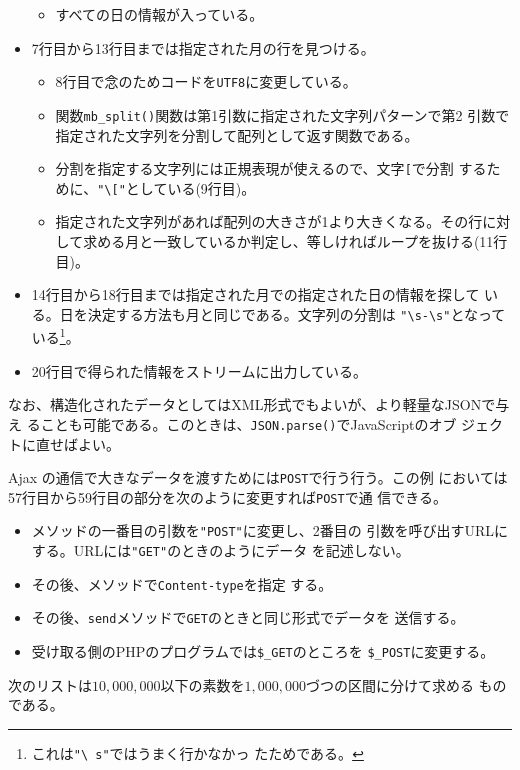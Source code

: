 \begin{Exec}
\begin{itemize}
\begin{itemize}
 \item すべての日の情報が入っている。
\end{itemize}
 \item 7行目から13行目までは指定された月の行を見つける。
\begin{itemize}
 \item 8行目で念のためコードを\texttt{UTF8}に変更している。
 \item 関数\Verb+mb_split()+関数は第1引数に指定された文字列パターンで第2
       引数で指定された文字列を分割して配列として返す関数である。
 \item 分割を指定する文字列には正規表現が使えるので、文字\Verb+[+で分割
       するために、\Verb+"\["+としている(9行目)。
 \item 指定された文字列があれば配列の大きさが1より大きくなる。その行に対
       して求める月と一致しているか判定し、等しければループを抜ける(11行
       目)。
\end{itemize}
 \item 14行目から18行目までは指定された月での指定された日の情報を探して
       いる。日を決定する方法も月と同じである。文字列の分割は
       \Verb+"\s-\s"+となっている\footnote{これは\texttt{"\textbackslash
       s"}ではうまく行かなかっ
       たためである。}。
 \item 20行目で得られた情報をストリームに出力している。
\end{itemize}
\end{Exec}
なお、構造化されたデータとしてはXML形式でもよいが、より軽量なJSONで与え
ることも可能である。このときは、\texttt{JSON.parse()}でJavaScriptのオブ
ジェクトに直せばよい。


Ajax の通信で大きなデータを渡すためには\texttt{POST}で行う行う。この例
においては57行目から59行目の部分を次のように変更すれば\texttt{POST}で通
信できる。
\begin{itemize}
 \item {}メソッドの一番目の引数を\Verb+"POST"+に変更し、2番目の
			 引数を呼び出すURLにする。URLには\Verb+"GET"+のときのようにデータ
			 を記述しない。
 \item その後、メソッドで\Verb+Content-type+を指定
			 する。
 \item その後、\Verb+send+メソッドで\Verb+GET+のときと同じ形式でデータを
			 送信する。
 \item 受け取る側のPHPのプログラムでは\Verb+$_GET+のところを
			 \Verb+$_POST+に変更する。
\end{itemize}

\begin{Exec}\upshape\label{contPrimes}
 次のリストは$10,000,000$以下の素数を$1,000,000$づつの区間に分けて求める
 ものである。

\end{Exec}